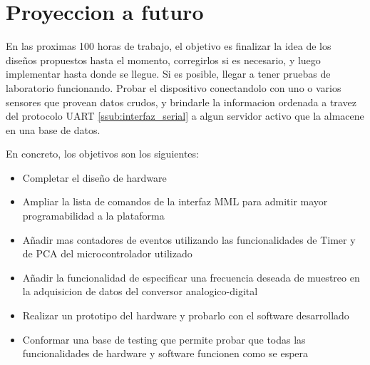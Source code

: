 \section{Proyeccion a futuro} %
\label{sec:proyeccion_a_futuro}

En las proximas 100 horas de trabajo, el objetivo es finalizar la idea de los dise\~nos propuestos hasta el momento, corregirlos si es necesario, y luego implementar hasta donde se llegue. Si es posible, llegar a tener pruebas de laboratorio funcionando. Probar el dispositivo conectandolo con uno o varios sensores que provean datos crudos, y brindarle la informacion ordenada a travez del protocolo UART \ref{ssub:interfaz_serial} a algun servidor activo que la almacene en una base de datos.

En concreto, los objetivos son los siguientes:
\begin{itemize}
	\item Completar el dise\~no de hardware
	\item Ampliar la lista de comandos de la interfaz MML para admitir mayor programabilidad a la plataforma
	\item A\~nadir mas contadores de eventos utilizando las funcionalidades de Timer y de PCA del microcontrolador utilizado
	\item A\~nadir la funcionalidad de especificar una frecuencia deseada de muestreo en la adquisicion de datos del conversor analogico-digital
	\item Realizar un prototipo del hardware y probarlo con el software desarrollado
	\item Conformar una base de testing que permite probar que todas las funcionalidades de hardware y software funcionen como se espera
\end{itemize}

